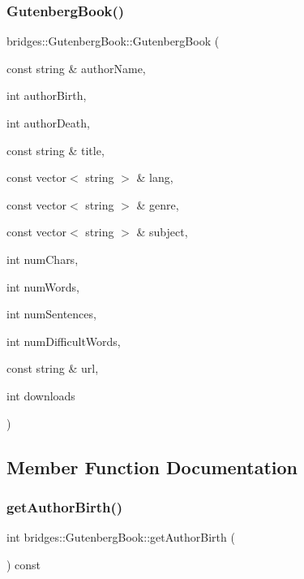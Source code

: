 \subsubsection{\texorpdfstring{GutenbergBook()}{GutenbergBook()}\hspace{0.1cm}{\footnotesize\ttfamily [2/2]}}
{\footnotesize\ttfamily bridges\+::\+Gutenberg\+Book\+::\+Gutenberg\+Book (\begin{DoxyParamCaption}\item[{const string \&}]{author\+Name,  }\item[{int}]{author\+Birth,  }\item[{int}]{author\+Death,  }\item[{const string \&}]{title,  }\item[{const vector$<$ string $>$ \&}]{lang,  }\item[{const vector$<$ string $>$ \&}]{genre,  }\item[{const vector$<$ string $>$ \&}]{subject,  }\item[{int}]{num\+Chars,  }\item[{int}]{num\+Words,  }\item[{int}]{num\+Sentences,  }\item[{int}]{num\+Difficult\+Words,  }\item[{const string \&}]{url,  }\item[{int}]{downloads }\end{DoxyParamCaption})\hspace{0.3cm}{\ttfamily [inline]}}



\subsection{Member Function Documentation}
\mbox{\label{classbridges_1_1_gutenberg_book_a044cf5c0a7d96c2f9f529889feab2b14}} 
\subsubsection{\texorpdfstring{getAuthorBirth()}{getAuthorBirth()}}
{\footnotesize\ttfamily int bridges\+::\+Gutenberg\+Book\+::get\+Author\+Birth (\begin{DoxyParamCaption}{ }\end{DoxyParamCaption}) const\hspace{0.3cm}{\ttfamily [inline]}}

